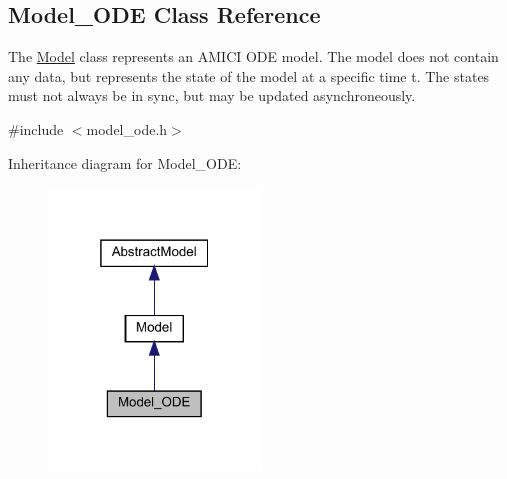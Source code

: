 \hypertarget{classamici_1_1_model___o_d_e}{}\subsection{Model\+\_\+\+O\+DE Class Reference}
\label{classamici_1_1_model___o_d_e}


The \mbox{\hyperlink{classamici_1_1_model}{Model}} class represents an A\+M\+I\+CI O\+DE model. The model does not contain any data, but represents the state of the model at a specific time t. The states must not always be in sync, but may be updated asynchroneously.  




{\ttfamily \#include $<$model\+\_\+ode.\+h$>$}



Inheritance diagram for Model\+\_\+\+O\+DE\+:
\nopagebreak
\begin{figure}[H]
\begin{center}
\leavevmode
\includegraphics[width=160pt]{classamici_1_1_model___o_d_e__inherit__graph}
\end{center}
\end{figure}
